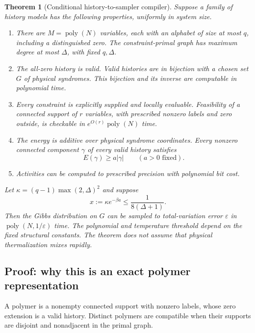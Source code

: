 \documentclass[11pt,a4paper]{article}
\newtheorem{theorem}{Theorem}
\newcommand{\poly}{\operatorname{poly}}
\begin{document}
\begin{theorem}[Conditional history-to-sampler compiler]\label{thm:compiler}
Suppose a family of history models has the following properties, uniformly in system size.
\begin{enumerate}
 \item There are $M=\poly(N)$ variables, each with an alphabet of size at most $q$, including a distinguished zero. The constraint-primal graph has maximum degree at most $\Delta$, with fixed $q,\Delta$.
 \item The all-zero history is valid. Valid histories are in bijection with a chosen set $G$ of physical syndromes. This bijection and its inverse are computable in polynomial time.
 \item Every constraint is explicitly supplied and locally evaluable. Feasibility of a connected support of $r$ variables, with prescribed nonzero labels and zero outside, is checkable in $e^{O(r)}\poly(N)$ time.
 \item The energy is additive over physical syndrome coordinates. Every nonzero connected component $\gamma$ of every valid history satisfies
 \begin{equation}\label{eq:coercive}
 E(\gamma)\geq a|\gamma|\qquad(a>0\text{ fixed}).
 \end{equation}
 \item Activities can be computed to prescribed precision with polynomial bit cost.
\end{enumerate}
Let $\kappa=(q-1)\max(2,\Delta)^2$ and suppose
\begin{equation}\label{eq:temperature}
 x:=\kappa e^{-\beta a}\leq\frac{1}{8(\Delta+1)}.
\end{equation}
Then the Gibbs distribution on $G$ can be sampled to total-variation error $\varepsilon$ in $\poly(N,1/\varepsilon)$ time. The polynomial and temperature threshold depend on the fixed structural constants. The theorem does not assume that physical thermalization mixes rapidly.
\end{theorem}

\subsection{Proof: why this is an exact polymer representation}

A polymer is a nonempty connected support with nonzero labels, whose zero extension is a valid history. Distinct polymers are compatible when their supports are disjoint and nonadjacent in the primal graph.
\end{document}
